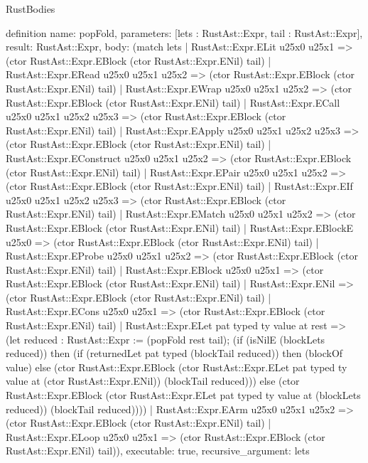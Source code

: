 \begin{lexlean}{RustBodies}
\begin{semanticmodule}
definition{
  name: popFold,
  parameters: [lets : RustAst::Expr, tail : RustAst::Expr],
  result: RustAst::Expr,
  body: (match lets
    | RustAst::Expr.ELit u25x0 u25x1 => (ctor RustAst::Expr.EBlock (ctor RustAst::Expr.ENil) tail)
    | RustAst::Expr.ERead u25x0 u25x1 u25x2 => (ctor RustAst::Expr.EBlock (ctor RustAst::Expr.ENil) tail)
    | RustAst::Expr.EWrap u25x0 u25x1 u25x2 => (ctor RustAst::Expr.EBlock (ctor RustAst::Expr.ENil) tail)
    | RustAst::Expr.ECall u25x0 u25x1 u25x2 u25x3 => (ctor RustAst::Expr.EBlock (ctor RustAst::Expr.ENil) tail)
    | RustAst::Expr.EApply u25x0 u25x1 u25x2 u25x3 => (ctor RustAst::Expr.EBlock (ctor RustAst::Expr.ENil) tail)
    | RustAst::Expr.EConstruct u25x0 u25x1 u25x2 => (ctor RustAst::Expr.EBlock (ctor RustAst::Expr.ENil) tail)
    | RustAst::Expr.EPair u25x0 u25x1 u25x2 => (ctor RustAst::Expr.EBlock (ctor RustAst::Expr.ENil) tail)
    | RustAst::Expr.EIf u25x0 u25x1 u25x2 u25x3 => (ctor RustAst::Expr.EBlock (ctor RustAst::Expr.ENil) tail)
    | RustAst::Expr.EMatch u25x0 u25x1 u25x2 => (ctor RustAst::Expr.EBlock (ctor RustAst::Expr.ENil) tail)
    | RustAst::Expr.EBlockE u25x0 => (ctor RustAst::Expr.EBlock (ctor RustAst::Expr.ENil) tail)
    | RustAst::Expr.EProbe u25x0 u25x1 u25x2 => (ctor RustAst::Expr.EBlock (ctor RustAst::Expr.ENil) tail)
    | RustAst::Expr.EBlock u25x0 u25x1 => (ctor RustAst::Expr.EBlock (ctor RustAst::Expr.ENil) tail)
    | RustAst::Expr.ENil => (ctor RustAst::Expr.EBlock (ctor RustAst::Expr.ENil) tail)
    | RustAst::Expr.ECons u25x0 u25x1 => (ctor RustAst::Expr.EBlock (ctor RustAst::Expr.ENil) tail)
    | RustAst::Expr.ELet pat typed ty value at rest => (let reduced : RustAst::Expr := (popFold rest tail); (if (isNilE (blockLets reduced)) then (if (returnedLet pat typed (blockTail reduced)) then (blockOf value) else (ctor RustAst::Expr.EBlock (ctor RustAst::Expr.ELet pat typed ty value at (ctor RustAst::Expr.ENil)) (blockTail reduced))) else (ctor RustAst::Expr.EBlock (ctor RustAst::Expr.ELet pat typed ty value at (blockLets reduced)) (blockTail reduced))))
    | RustAst::Expr.EArm u25x0 u25x1 u25x2 => (ctor RustAst::Expr.EBlock (ctor RustAst::Expr.ENil) tail)
    | RustAst::Expr.ELoop u25x0 u25x1 => (ctor RustAst::Expr.EBlock (ctor RustAst::Expr.ENil) tail)),
  executable: true,
  recursive_argument: lets
}


\end{semanticmodule}
\end{lexlean}
